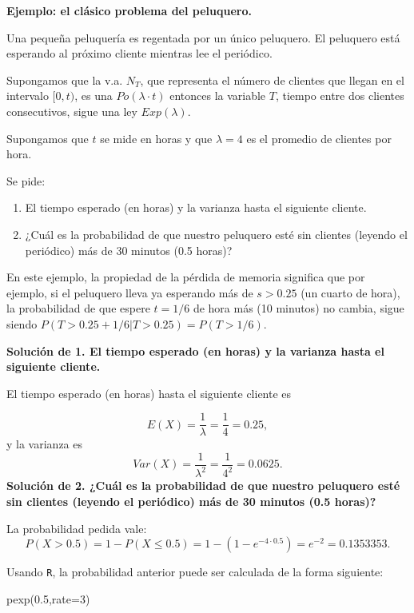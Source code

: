 \documentclass[
  letterpaper,
  DIV=11,
  numbers=noendperiod]{scrreprt}
\newenvironment{Shaded}{\begin{snugshade}}{\end{snugshade}}
\newcommand{\AttributeTok}[1]{\textcolor[rgb]{0.40,0.45,0.13}{#1}}
\newcommand{\DecValTok}[1]{\textcolor[rgb]{0.68,0.00,0.00}{#1}}
\newcommand{\FloatTok}[1]{\textcolor[rgb]{0.68,0.00,0.00}{#1}}
\newcommand{\FunctionTok}[1]{\textcolor[rgb]{0.28,0.35,0.67}{#1}}
\newcommand{\NormalTok}[1]{\textcolor[rgb]{0.00,0.23,0.31}{#1}}
\providecommand{\tightlist}{%
  \setlength{\itemsep}{0pt}\setlength{\parskip}{0pt}}\usepackage{longtable,booktabs,array}
\begin{document}
\textbf{Ejemplo: el clásico problema del peluquero.}

Una pequeña peluquería es regentada por un único peluquero. El peluquero
está esperando al próximo cliente mientras lee el periódico.

Supongamos que la v.a. \(N_T\), que representa el número de clientes que
llegan en el intervalo \([0,t)\), es una \(Po(\lambda\cdot t)\) entonces
la variable \(T\), tiempo entre dos clientes consecutivos, sigue una ley
\(Exp(\lambda)\).

Supongamos que \(t\) se mide en horas y que \(\lambda=4\) es el promedio
de clientes por hora.

Se pide:

\begin{enumerate}
\def\labelenumi{\arabic{enumi}.}
\tightlist
\item
  El tiempo esperado (en horas) y la varianza hasta el siguiente
  cliente.
\item
  ¿Cuál es la probabilidad de que nuestro peluquero esté sin clientes
  (leyendo el periódico) más de 30 minutos (0.5 horas)?
\end{enumerate}

En este ejemplo, la propiedad de la pérdida de memoria significa que por
ejemplo, si el peluquero lleva ya esperando más de \(s>0.25\) (un cuarto
de hora), la probabilidad de que espere \(t=1/6\) de hora más (10
minutos) no cambia, sigue siendo \(P(T>0.25+1/6|T>0.25)=P(T>1/6).\)

\textbf{Solución de 1. El tiempo esperado (en horas) y la varianza hasta
el siguiente cliente.}

El tiempo esperado (en horas) hasta el siguiente cliente es

\[
E(X)=\frac{1}{\lambda}=\frac{1}{4}=0.25,
\] y la varianza es \[
Var(X)=\frac{1}{\lambda^2}=\frac{1}{4^2}=0.0625.
\] \textbf{Solución de 2. ¿Cuál es la probabilidad de que nuestro
peluquero esté sin clientes (leyendo el periódico) más de 30 minutos
(0.5 horas)?}

La probabilidad pedida vale: \[
P(X>0.5)=1-P(X\leq 0.5)=1-(1-e^{-4\cdot 0.5 })=e^{-2}=0.1353353.
\]

Usando \texttt{R}, la probabilidad anterior puede ser calculada de la
forma siguiente:

\begin{Shaded}
\begin{Highlighting}[]
\FunctionTok{pexp}\NormalTok{(}\FloatTok{0.5}\NormalTok{,}\AttributeTok{rate=}\DecValTok{3}\NormalTok{)}
\end{Highlighting}
\end{Shaded}
\end{document}
